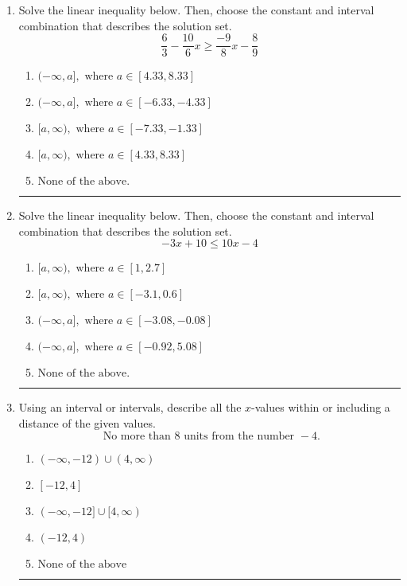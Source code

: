 \documentclass[14pt]{extbook}
\newcommand{\litem}[1]{\item#1\hspace*{-1cm}\rule{\textwidth}{0.4pt}}
\begin{document}
\begin{enumerate}
{\begin{enumerate}[label=\Alph*.]
\end{enumerate} }
\litem{
Solve the linear inequality below. Then, choose the constant and interval combination that describes the solution set.\[ \frac{6}{3} - \frac{10}{6} x \geq \frac{-9}{8} x - \frac{8}{9} \]\begin{enumerate}[label=\Alph*.]
\item \( (-\infty, a], \text{ where } a \in [4.33, 8.33] \)
\item \( (-\infty, a], \text{ where } a \in [-6.33, -4.33] \)
\item \( [a, \infty), \text{ where } a \in [-7.33, -1.33] \)
\item \( [a, \infty), \text{ where } a \in [4.33, 8.33] \)
\item \( \text{None of the above}. \)

\end{enumerate} }
\litem{
Solve the linear inequality below. Then, choose the constant and interval combination that describes the solution set.\[ -3x + 10 \leq 10x -4 \]\begin{enumerate}[label=\Alph*.]
\item \( [a, \infty), \text{ where } a \in [1, 2.7] \)
\item \( [a, \infty), \text{ where } a \in [-3.1, 0.6] \)
\item \( (-\infty, a], \text{ where } a \in [-3.08, -0.08] \)
\item \( (-\infty, a], \text{ where } a \in [-0.92, 5.08] \)
\item \( \text{None of the above}. \)

\end{enumerate} }
\litem{
Using an interval or intervals, describe all the $x$-values within or including a distance of the given values.\[ \text{ No more than } 8 \text{ units from the number } -4. \]\begin{enumerate}[label=\Alph*.]
\item \( (-\infty, -12) \cup (4, \infty) \)
\item \( [-12, 4] \)
\item \( (-\infty, -12] \cup [4, \infty) \)
\item \( (-12, 4) \)
\item \( \text{None of the above} \)


\end{enumerate}}
\end{enumerate}
\end{document}
